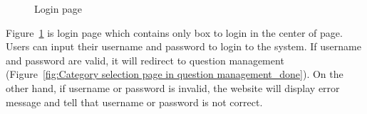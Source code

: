 \documentclass[12pt,oneside,openright,a4paper]{cpe-english-project}
\begin{document}
		\begin{figure}[!h]\centering
			\caption{Login page}\label{fig:Login_page_done}
		\end{figure}
		\begin{flushleft}
			Figure~\ref*{fig:Login_page_done} is login page which contains only box to login in the center of page. Users can input their username and password to login to the system. If username and password are valid, it will redirect to question management (Figure~\ref*{fig:Category selection page in question management_done}). On the other hand, if username or password is invalid, the website will display error message and tell that username or password is not correct.
		\end{flushleft}
\end{document}
